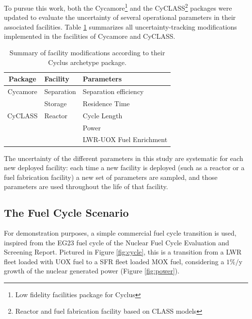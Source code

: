 \documentclass{anstrans}
\begin{document}
To pursue this work, both the Cycamore\footnote{Low fidelity facilities package
for Cyclus}\cite{cycamore} and the CyCLASS\footnote{Reactor and fuel fabrication
facility based on CLASS\cite{CLASS} models}\cite{mouginot_2018, cyclass}
packages were updated to evaluate the uncertainty of several operational
parameters in their associated facilities.  Table \ref{tab:package_uncertainty}
summarizes all uncertainty-tracking modifications implemented in the facilities
of Cycamore and CyCLASS.

\begin{table}[htb]
\centering
  \caption{Summary of facility modifications according to their Cyclus archetype package.}
\begin{tabular}{cl|l}
\toprule

Package   & Facility   & Parameters                \\
\toprule

Cycamore & Separation & Separation efficiency     \\\cmidrule{2-3} 
         & Storage    & Residence Time            \\
\toprule
CyCLASS  & Reactor    & Cycle Length              \\\cmidrule{3-3}
         &            & Power                     \\\cmidrule{3-3}
         &            & \acrshort{LWR}-\acrshort{UOX} Fuel Enrichment\\

\bottomrule
\end{tabular}

  \label{tab:package_uncertainty}
\end{table}

The uncertainty of the different parameters in this study are systematic for
each new deployed facility: each time a new facility is deployed (such as a
reactor or a fuel fabrication facility) a new set of parameters are sampled, and
those parameters are used throughout the life of that facility.


\subsection{The Fuel Cycle Scenario}

For demonstration purposes, a simple commercial fuel cycle transition is used,
inspired from the EG23 fuel cycle of the Nuclear Fuel Cycle Evaluation and
Screening Report\cite{ES}.  Pictured in Figure \ref{fig:cycle}, this is a
transition from a \gls{LWR} fleet loaded with \gls{UOX} fuel to a \gls{SFR}
fleet loaded \gls{MOX} fuel, considering a $1\%/$y growth of the nuclear
generated power (Figure \ref{fig:power}).
\end{document}
